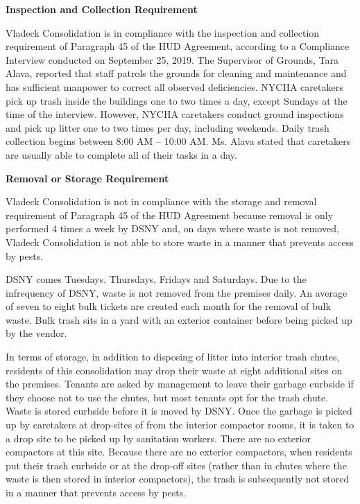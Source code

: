 


\textbf{Inspection and Collection Requirement}

Vladeck Consolidation is in compliance with the inspection and collection requirement of  Paragraph 45 of the HUD Agreement, according to a Compliance Interview conducted on September 25, 2019. The Supervisor of Grounds, Tara Alava, reported that staff patrols the grounds for cleaning and maintenance and has sufficient manpower to correct all observed deficiencies. NYCHA caretakers pick up trash inside the buildings one to two times a day, except Sundays at the time of the interview. However, NYCHA caretakers conduct ground inspections and pick up litter one to two times per day, including weekends. Daily trash collection begins between 8:00 AM -- 10:00 AM. Ms. Alava stated that caretakers are usually able to complete all of their tasks in a day.

\textbf{Removal or Storage Requirement}

Vladeck Consolidation is not in compliance with the storage and removal requirement of Paragraph 45 of the HUD Agreement because removal is only performed 4 times a week by DSNY and, on days where waste is not removed, Vladeck Consolidation is not able to store waste in a manner that prevents access by pests. 



DSNY comes Tuesdays, Thursdays, Fridays and Saturdays. Due to the infrequency of DSNY, waste is not removed from the premises daily. An average of seven to eight bulk tickets are created each month for the removal of bulk waste. Bulk trash sits in a yard with an exterior container before being picked up by the vendor.

In terms of storage, in addition to disposing of litter into interior trash chutes, residents of this consolidation may drop their waste at eight additional sites on the premises. Tenants are asked by management to leave their garbage curbside if they choose not to use the chutes, but most tenants opt for the trash chute. Waste is stored curbside before it is moved by DSNY. Once the garbage is picked up by caretakers at drop-sites of from the interior compactor rooms, it is taken to a drop site to be picked up by sanitation workers. There are no exterior compactors at this site. Because there are no exterior compactors, when residents put their trash curbside or at the drop-off sites (rather than in chutes where the waste is then stored in interior compactors), the trash is subsequently not stored in a manner that prevents access by pests.

